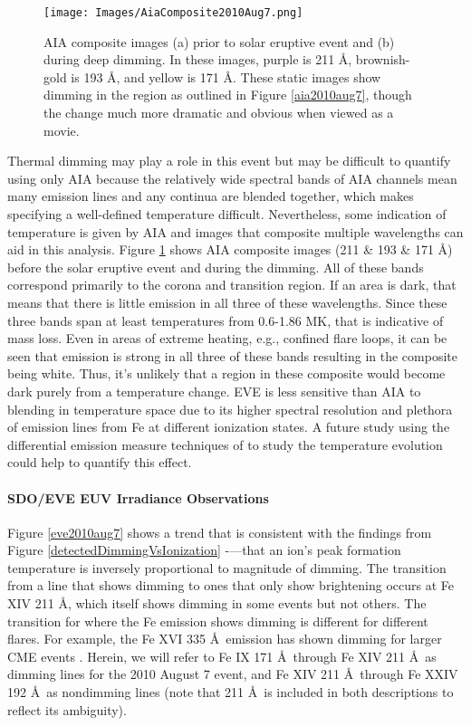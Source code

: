 \begin{figure}[!h]
	\caption[AIA before/after images of 2010 August 7 event]{
	    AIA composite images (a) prior to solar eruptive event and (b) during deep dimming. In these images, purple is 
	    211 \AA, brownish-gold is 193 \AA, and yellow is 171 \AA. These static images show dimming in the region as outlined 
	    in Figure \ref{aia2010aug7}, though the change much more dramatic and obvious when viewed as a movie. 
	}
    \begin{center}
	    \texttt{[image: Images/AiaComposite2010Aug7.png]}
    \end{center}
    \label{aiacomposite2010aug7}
\end{figure}

Thermal dimming may play a role in this event but may be difficult to quantify using only AIA because the relatively wide spectral bands of AIA channels mean many emission lines and any continua are blended together, which makes specifying a well-defined temperature difficult. Nevertheless, some indication of temperature is given by AIA and images that composite multiple wavelengths can aid in this analysis. Figure \ref{aiacomposite2010aug7} shows AIA composite images (211 \& 193 \& 171 \AA) before the solar eruptive event and during the dimming. All of these bands correspond primarily to the corona and transition region. If an area is dark, that means that there is little emission in all three of these wavelengths. Since these three bands span at least temperatures from 0.6-1.86 MK, that is indicative of mass loss. Even in areas of extreme heating, e.g., confined flare loops, it can be seen that emission is strong in all three of these bands resulting in the composite being white. Thus, it's unlikely that a region in these composite would become dark purely from a temperature change. EVE is less sensitive than AIA to blending in temperature space due to its higher spectral resolution and plethora of emission lines from Fe at different ionization states. A future study using the differential emission measure techniques of \citet{Caspi2014} to study the temperature evolution could help to quantify this effect.

\paragraph{SDO/EVE EUV Irradiance Observations}
Figure \ref{eve2010aug7} shows a trend that is consistent with the findings from Figure \ref{detectedDimmingVsIonization} -—that an ion’s peak formation temperature is inversely proportional to magnitude of dimming. The transition from a line that shows dimming to ones that only show brightening occurs at Fe XIV 211 \AA, which itself shows dimming in some events but not others. The transition for where the Fe emission shows dimming is different for different flares. For example, the Fe XVI 335 \AA\ emission has shown dimming for larger CME events \citep{Woods2011}. Herein, we will refer to Fe IX 171 \AA\ through Fe XIV 211 \AA\ as dimming lines for the 2010 August 7 event, and Fe XIV 211 \AA\ through Fe XXIV 192 \AA\ as nondimming lines (note that 211 \AA\ is included in both descriptions to reflect its ambiguity).

